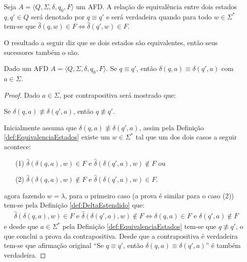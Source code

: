 \begin{definition}\label{def:EquivalenciaEstados}
	Seja $A = \langle Q, \Sigma, \delta, q_0, F\rangle$ um AFD. A relação de equivalência entre dois estados $q, q' \in Q$ será denotado por $q \equiv q'$ e será verdadeira quando para todo $w \in \Sigma^*$ tem-se que $\widehat{\delta}(q, w) \in F \Longleftrightarrow \widehat{\delta}(q', w) \in F$.
\end{definition} 

O resultado a seguir diz que se dois estados são equivalentes, então seus sucessores também o são.

\begin{lemma}\label{lema:SucessoresEquivalentes}
	Dado um AFD $A = \langle Q, \Sigma, \delta, q_0, F\rangle$. Se $q \equiv q'$, então $\delta(q, a) \equiv \delta(q', a)$ com $a \in \Sigma$.
\end{lemma}

\begin{proof}
	Dado $a \in \Sigma$, por contrapositiva será mostrado que: 
	\begin{center}
		Se $\delta(q, a) \not\equiv \delta(q', a)$, então $q \not\equiv q'$. 
	\end{center}
	Inicialmente assuma que $\delta(q, a) \not\equiv \delta(q', a)$, assim pela Definição \ref{def:EquivalenciaEstados} existe um $w \in \Sigma^*$ tal que um dos dois casos a seguir acontece:
	\begin{itemize}
		\item[(1)] $\widehat{\delta}(\delta(q, a), w)  \in F$ e $\widehat{\delta}(\delta(q', a), w)  \notin F$ ou
		\item[(2)] $\widehat{\delta}(\delta(q, a), w)  \notin F$ e $\widehat{\delta}(\delta(q', a), w)  \in F$.
	\end{itemize}
	agora fazendo $w = \lambda$, para o primeiro caso (a prova é similar para o caso (2)) tem-se pela Definição \ref{def:DeltaEstendido} que:
	\begin{eqnarray*}
		\widehat{\delta}(\delta(q, a), w)  \in F \text{ e } \widehat{\delta}(\delta(q', a), w)  \notin F \Longleftrightarrow \delta(q, a)  \in F \text{ e }\delta(q', a)  \notin F
	\end{eqnarray*}
	e desde que $a \in \Sigma^*$ pela Definição \ref{def:EquivalenciaEstados} tem-se que $q \not\equiv q'$, o que conclui a prova da contrapositiva. Desde que a contrapositiva é verdadeira tem-se que afirmação original ``Se $q \equiv q'$, então $\delta(q, a) \equiv \delta(q', a)$'' é também verdadeira.
\end{proof}

